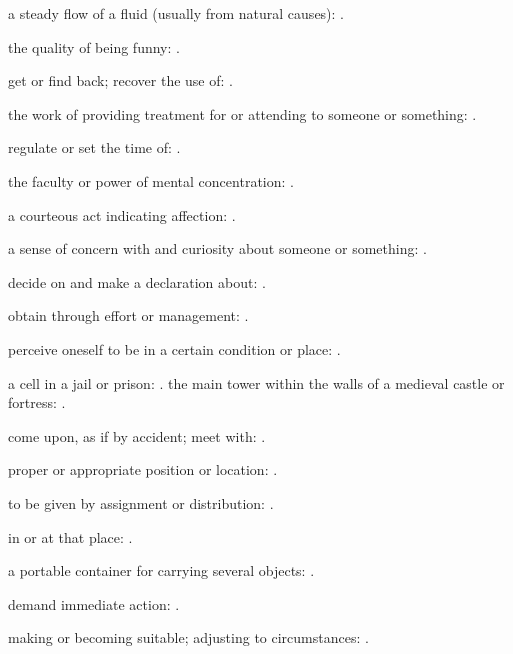   a steady flow of a fluid (usually from natural causes):   .

  the quality of being funny:   .

  get or find back; recover the use of:   .

  the work of providing treatment for or attending to someone or something:   .

  regulate or set the time of: .

  the faculty or power of mental concentration: .

  a courteous act indicating affection: .

  a sense of concern with and curiosity about someone or something:   .

  decide on and make a declaration about:   .

  obtain through effort or management: .

  perceive oneself to be in a certain condition or place: .

  a cell in a jail or prison:   . the main tower within the walls of a medieval castle or fortress:   .

  come upon, as if by accident; meet with:   .

  proper or appropriate position or location: .

  to be given by assignment or distribution: .

  in or at that place:   .

  a portable container for carrying several objects: .

  demand immediate action: .

  making or becoming suitable; adjusting to circumstances:   .

